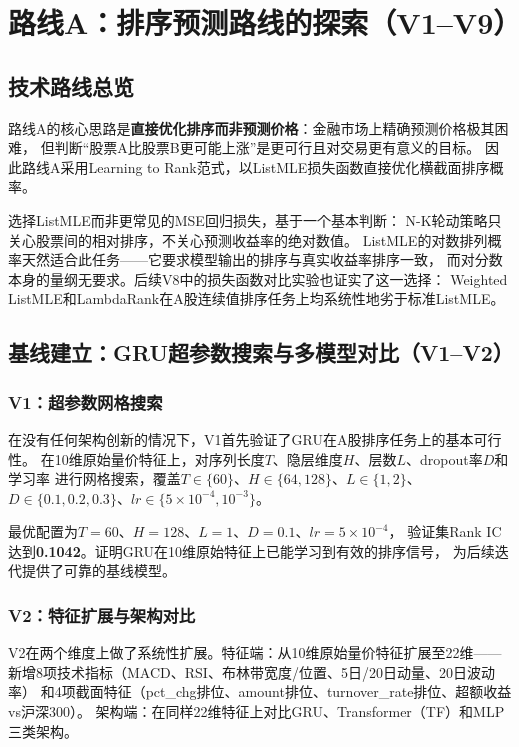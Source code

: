 \documentclass[12pt,a4paper]{ctexart}
\begin{document}
\section{路线A：排序预测路线的探索（V1--V9）}

\subsection{技术路线总览}

路线A的核心思路是\textbf{直接优化排序而非预测价格}：金融市场上精确预测价格极其困难，
但判断“股票A比股票B更可能上涨”是更可行且对交易更有意义的目标。
因此路线A采用Learning to Rank范式，以ListMLE损失函数直接优化横截面排序概率。

选择ListMLE而非更常见的MSE回归损失，基于一个基本判断：
N-K轮动策略只关心股票间的相对排序，不关心预测收益率的绝对数值。
ListMLE的对数排列概率天然适合此任务——它要求模型输出的排序与真实收益率排序一致，
而对分数本身的量纲无要求。后续V8中的损失函数对比实验也证实了这一选择：
Weighted ListMLE和LambdaRank在A股连续值排序任务上均系统性地劣于标准ListMLE。


\subsection{基线建立：GRU超参数搜索与多模型对比（V1--V2）}

\subsubsection{V1：超参数网格搜索}

在没有任何架构创新的情况下，V1首先验证了GRU在A股排序任务上的基本可行性。
在10维原始量价特征上，对序列长度$T$、隐层维度$H$、层数$L$、dropout率$D$和学习率
进行网格搜索，覆盖$T\in\{60\}$、$H\in\{64,128\}$、$L\in\{1,2\}$、
$D\in\{0.1,0.2,0.3\}$、$lr\in\{5\times10^{-4}, 10^{-3}\}$。

最优配置为$T=60$、$H=128$、$L=1$、$D=0.1$、$lr=5\times10^{-4}$，
验证集Rank IC达到\textbf{0.1042}。证明GRU在10维原始特征上已能学习到有效的排序信号，
为后续迭代提供了可靠的基线模型。

\subsubsection{V2：特征扩展与架构对比}

V2在两个维度上做了系统性扩展。特征端：从10维原始量价特征扩展至22维——
新增8项技术指标（MACD、RSI、布林带宽度/位置、5日/20日动量、20日波动率）
和4项截面特征（pct\_chg排位、amount排位、turnover\_rate排位、超额收益vs沪深300）。
架构端：在同样22维特征上对比GRU、Transformer（TF）和MLP三类架构。
\end{document}
